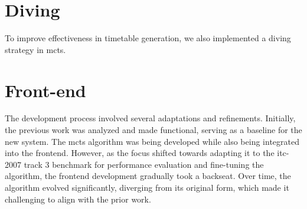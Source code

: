 \section{Diving}

To improve effectiveness in timetable generation, we also implemented a diving strategy in \ac{mcts}.

\section{Front-end}

The development process involved several adaptations and refinements. Initially, the previous work was analyzed and made functional, serving as a baseline for the new system. The \ac{mcts} algorithm was being developed while also being integrated into the frontend. However, as the focus shifted towards adapting it to the \ac{itc-2007} track 3 benchmark for performance evaluation and fine-tuning the algorithm, the frontend development gradually took a backseat. Over time, the algorithm evolved significantly, diverging from its original form, which made it challenging to align with the prior work.

